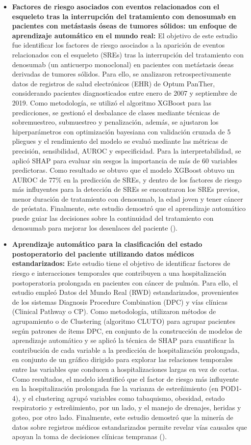 \begin{itemize}
    \item \textbf{Factores de riesgo asociados con eventos relacionados con el esqueleto tras la interrupción del tratamiento con denosumab en pacientes con metástasis óseas de tumores sólidos: un enfoque de aprendizaje automático en el mundo real:} El objetivo de este estudio fue identificar los factores de riesgo asociados a la aparición de eventos relacionados con el esqueleto (SREs) tras la interrupción del tratamiento con denosumab (un anticuerpo monoclonal) en pacientes con metástasis óseas derivadas de tumores sólidos. Para ello, se analizaron retrospectivamente datos de registros de salud electrónicos (EHR) de Optum PanTher, considerando pacientes diagnosticados entre enero de 2007 y septiembre de 2019. Como metodología, se utilizó el algoritmo XGBoost para las predicciones, se gestionó el desbalance de clases mediante técnicas de sobremuestreo, submuestreo y penalización, además, se ajustaron los hiperparámetros con optimización bayesiana con validación cruzada de 5 pliegues y el rendimiento del modelo se evaluó mediante las métricas de precisión, sensibilidad, AUROC y especificidad. Para la interpretabilidad, se aplicó SHAP para evaluar sin sesgos la importancia de más de 60 variables predictoras. Como resultado se obtuvo que el modelo XGBoost obtuvo un AUROC de 77\% en la predicción de SREs, y dentro de los factores de riesgo más influyentes para la detección de SREs se encontraron los SREs previos, menor duración de tratamiento con denosumab, la edad joven y tener cáncer de próstata. Finalmente, este estudio demostró que el aprendizaje automático puede guiar las decisiones sobre la continuidad del tratamiento con denosumab para mejorar los desenlaces del paciente (\cite{article6}).
    \item \textbf{Aprendizaje automático para la clasificación del estado postoperatorio del paciente utilizando datos médicos estandarizados:} Este estudio tiene el objetivo de identificar factores de riesgo e interacciones temporales que contribuyen a una hospitalización postoperatoria prolongada en pacientes con cáncer de pulmón. Para ello, el estudio empleó Datos del Mundo Real (RWD) estandarizados, provenientes de los sistemas Diagnosis Procedure Combination (DPC) y vías clínicas (Clinical Pathway o CP). Como metodología, utilizaron métodos de agrupamiento o de Clustering (algoritmo CLUTO) para agrupar pacientes según patrones de ítems DPC, en conjunto de la construcción de modelos de aprendizaje automático y se aplicó la técnica de SHAP para cuantificar la contribución de cada variable a la predicción de hospitalización prolongada, en conjunto de un gráfico dirigido para explorar las relaciones temporales entre las variables que conducen a hospitalizaciones largas en vez de cortas. Como resultados, el modelo identificó que el factor de riesgo más influyente en la hospitalización prolongada fue la varianza de estreñimiento (en POD1-4), y el clustering agrupó variables como tabaquismo, obesidad, estado respiratorio y estreñimiento, por un lado, y el manejo de drenajes, heridas y goteo, por otro lado. Finalmente, este estudio demostró que la minería de datos sobre registros médicos estandarizados permite revelar vías causales que apoyan la toma de decisiones clínicas tempranas (\cite{article7}).

\end{itemize}
